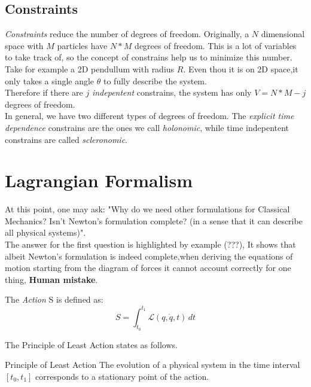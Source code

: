 \documentclass[english, a4paper,12pt]{Iart}
\theoremstyle{plain} %
\newcommand{\thistheoremname}{}
\newtheorem*{genericthm*}{\thistheoremname}
\newenvironment{namedthm*}[1]
{\renewcommand{\thistheoremname}{#1}%
	\begin{genericthm*}}
	{\end{genericthm*}}
\theoremstyle{remark}
\theoremstyle{definition}
\begin{document}
		\section{Constraints}
		\textit{Constraints} reduce the number of degrees
		of freedom. Originally, a $N$ dimensional space
		with $M$ particles have $N*M$ degrees of freedom.
		This is a lot of variables to take track of, so
		the concept of constrains help us to minimize
		this number.\\
		Take for example a 2D pendullum with radius $R$.
		Even thou it is on 2D space,it only takes a single
		angle $\theta$ to fully describe the system.\\
		Therefore if there are $j$ \textit{indepentent}
		constrains, the system has only $V = N*M - j$
		degrees of freedom.\\
		In general, we have two different types of
		degrees of freedom. The \textit{explicit time dependence}
		constrains are the ones we call
		\textit{holonomic}, while time indepentent
		constrains are called \textit{scleronomic}.
		
	\chapter{Lagrangian Formalism}
		
		At this point, one may ask: "Why do we need other formulations for Classical Mechanics? Isn't Newton's formulation complete? (in a sense that it can describe all physical systems)".\\
		The answer for the first question is highlighted by example 	
		(???), It shows that albeit Newton's formulation is indeed complete,when deriving the equations of motion starting from the diagram of forces it cannot account correctly for one thing, \textbf{Human mistake}.
		
		
		
		The \textit{Action} S is defined as:
		\begin{equation}
			S = \int_{t_0}^{t_1} \mathcal{L}(q, \dot{q}, t) \, dt
		\end{equation}
		
		The Principle of Least Action states as follows.
		
		\begin{namedthm*}{Principle of Least Action}
			The evolution of a physical system in the time interval $[t_0, t_1]$ corresponds to a stationary point of the action.
		\end{namedthm*}
		
\end{document}
